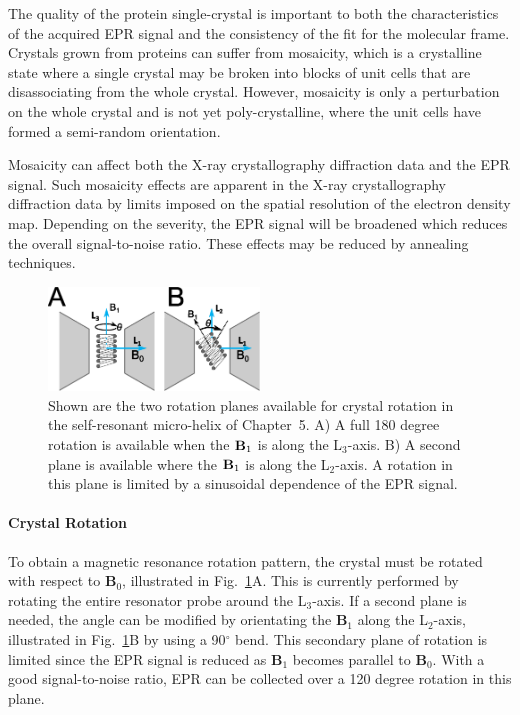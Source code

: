 The quality of the protein single-crystal is important to both the characteristics of the acquired EPR signal and the consistency of the fit for the molecular frame. Crystals grown from proteins can suffer from mosaicity, which is a crystalline state where a single crystal may be broken into blocks of unit cells that are disassociating from the whole crystal. However, mosaicity is only a perturbation on the whole crystal and is not yet poly-crystalline, where the unit cells have formed a semi-random orientation. 

Mosaicity can affect both the X-ray crystallography diffraction data and the EPR signal. Such mosaicity effects are apparent in the X-ray crystallography diffraction data by limits imposed on the spatial resolution of the electron density map. \cite{blundell1976protein} Depending on the severity, the EPR signal will be broadened which reduces the overall signal-to-noise ratio. These effects may be reduced by annealing techniques. \cite{Kriminskien0056}

\begin{figure}[htb]
 \centering
 \includegraphics[width=0.5\textwidth]{Kapitel/Ch2-Images/RotateMeLeftRight.eps}
 \caption[Rotation Planes of micro-Helix.]{Shown are the two rotation planes available for crystal rotation in the self-resonant micro-helix of Chapter~5. A) A full 180 degree rotation is available when the ${\textbf B}_1$ is along the L$_3$-axis. B) A second plane is available where the ${\textbf B}_1$ is along the L$_2$-axis. A rotation in this plane is limited by a sinusoidal dependence of the EPR signal. }
 \label{fig:RotateMe}
\end{figure}

\paragraph*{Crystal Rotation} To obtain a magnetic resonance rotation pattern, the crystal must be rotated with respect to $\mathbf{B}_0$, illustrated in Fig.~\ref{fig:RotateMe}A. This is currently performed by rotating the entire resonator probe around the L$_3$-axis. If a second plane is needed, the angle can be modified by orientating the $\mathbf{B}_1$ along the L$_2$-axis, illustrated in Fig.~\ref{fig:RotateMe}B by using a 90$^{\circ}$ bend. This secondary plane of rotation is limited since the EPR signal is reduced as $\mathbf{B}_1$ becomes parallel to $\mathbf{B}_0$. With a good signal-to-noise ratio, EPR can be collected over a 120 degree rotation in this plane.

